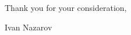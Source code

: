 \documentclass[14pt]{letter}
\begin{document}

\hfill Thank you for your consideration,\par%
\hfill Ivan Nazarov
\end{document}
